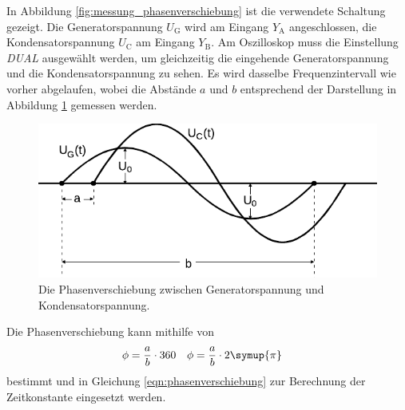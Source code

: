     In Abbildung \ref{fig:messung_phasenverschiebung} ist die verwendete Schaltung gezeigt.
    Die Generatorspannung $U_\text{G}$ wird am Eingang $Y_\text{A}$ angeschlossen,
    die Kondensatorspannung $U_\text{C}$ am Eingang $Y_\text{B}$.
    Am Oszilloskop muss die Einstellung \textit{DUAL} ausgewählt werden,
    um gleichzeitig die eingehende Generatorspannung und die Kondensatorspannung zu sehen.
    Es wird dasselbe Frequenzintervall wie vorher abgelaufen,
    wobei die Abstände $a$ und $b$ entsprechend der Darstellung in Abbildung \ref{fig:phasenverschiebung} gemessen werden.

    \begin{figure}
        \centering
        \includegraphics{content/img/Abb_7_edit.pdf}
        \caption{Die Phasenverschiebung zwischen Generatorspannung und Kondensatorspannung.}
        \label{fig:phasenverschiebung}
    \end{figure}

    Die Phasenverschiebung kann mithilfe von
    \begin{align*}
        \phi &= \frac{a}{b} \cdot 360 & \phi &= \frac{a}{b} \cdot 2 \symup{\pi}
    \end{align*}
    bestimmt und in Gleichung \eqref{eqn:phasenverschiebung} zur Berechnung der Zeitkonstante eingesetzt werden.
